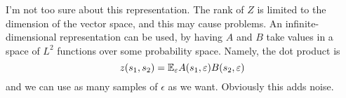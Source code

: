 \documentclass[11pt,a4paper]{article}
\newcommand{\noise}{\epsilon}
\begin{document}
I'm not too sure about this representation. The rank of $Z$ is limited to
the dimension of the vector space, and this may cause problems. An
infinite-dimensional representation can be used, by having $A$ and $B$
take values in a space of $L^2$ functions over some probability space.
Namely, the dot product is
\begin{equation}
z(s_1,s_2)=\E_{\noise} A(s_1,\eps)B(s_2,\eps)
\end{equation}
and we can use as many samples of $\noise$ as we want. Obviously this
adds noise.
\end{document}
